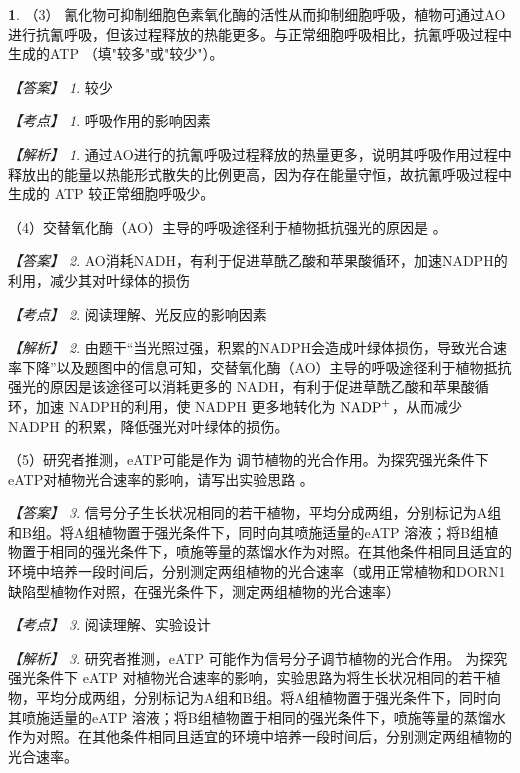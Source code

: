 \documentclass[UTF8, 10pt, a4paper, oneside]{ctexart}
\newcommand{\blank}{ \underbar{\quad$\blacktriangle$\quad} }%
\theoremstyle{definition}
\newtheorem{exercise}{}
\theoremstyle{remark}
\newtheorem*{answer}{【答案】}
\newtheorem*{point}{【考点】}      %
\newtheorem*{explanation}{【解析】}     %
\theoremstyle{plain}
\begin{document}
\begin{exercise}
    （3） 氰化物可抑制细胞色素氧化酶的活性从而抑制细胞呼吸，植物可通过AO进行抗氰呼吸，但该过程释放的热能更多。与正常细胞呼吸相比，抗氰呼吸过程中生成的ATP\blank（填"较多"或"较少"）。

    \begin{answer}
        较少
    \end{answer}
    \begin{point}
        呼吸作用的影响因素
    \end{point}
    \begin{explanation}
        通过AO进行的抗氰呼吸过程释放的热量更多，说明其呼吸作用过程中释放出的能量以热能形式散失的比例更高，因为存在能量守恒，故抗氰呼吸过程中生成的 ATP 较正常细胞呼吸少。
    \end{explanation}

    （4）交替氧化酶（AO）主导的呼吸途径利于植物抵抗强光的原因是\blank。

    \begin{answer}
        AO消耗NADH，有利于促进草酰乙酸和苹果酸循环，加速NADPH的利用，减少其对叶绿体的损伤
    \end{answer}
    \begin{point}
        阅读理解、光反应的影响因素
    \end{point}
    \begin{explanation}
        由题干“当光照过强，积累的NADPH会造成叶绿体损伤，导致光合速率下降”以及题图中的信息可知，交替氧化酶（AO）主导的呼吸途径利于植物抵抗强光的原因是该途径可以消耗更多的 NADH，有利于促进草酰乙酸和苹果酸循环，加速 NADPH的利用，使 NADPH 更多地转化为 $\ce{NADP+}$，从而减少 NADPH 的积累，降低强光对叶绿体的损伤。
    \end{explanation}

    （5）研究者推测，eATP可能是作为\blank 调节植物的光合作用。为探究强光条件下eATP对植物光合速率的影响，请写出实验思路\blank。

    \begin{answer}
        信号分子\qquad 生长状况相同的若干植物，平均分成两组，分别标记为A组和B组。将A组植物置于强光条件下，同时向其喷施适量的eATP 溶液；将B组植物置于相同的强光条件下，喷施等量的蒸馏水作为对照。在其他条件相同且适宜的环境中培养一段时间后，分别测定两组植物的光合速率（或用正常植物和DORN1缺陷型植物作对照，在强光条件下，测定两组植物的光合速率）
    \end{answer}
    \begin{point}
        阅读理解、实验设计
    \end{point}
    \begin{explanation}
        研究者推测，eATP 可能作为信号分子调节植物的光合作用。
        为探究强光条件下 eATP 对植物光合速率的影响，实验思路为将生长状况相同的若干植物，平均分成两组，分别标记为A组和B组。将A组植物置于强光条件下，同时向其喷施适量的eATP 溶液；将B组植物置于相同的强光条件下，喷施等量的蒸馏水作为对照。在其他条件相同且适宜的环境中培养一段时间后，分别测定两组植物的光合速率。

    \end{explanation}

\end{exercise}
\end{document}
